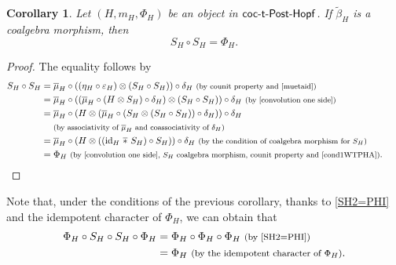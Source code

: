 \documentclass[pdftex]{sigma}
\numberwithin{equation}{section}
\newtheorem{Corollary}[Theorem]{Corollary}
\DeclareMathOperator{\barast}{\,\overline{\ast}\,}
\begin{document}
\begin{Corollary}
Let $(H,m_{H},\Phi_{H})$ be an object in $\sf{coc}\textnormal{-}\sf{t}\textnormal{-}\sf{Post}\textnormal{-}\sf{Hopf}$. If $\tilde{\beta}_{H}$ is a coalgebra morphism, then
\begin{equation}\label{SH2=PHI}
S_{H}\circ S_{H}=\Phi_{H}.
\end{equation}
\end{Corollary}
\begin{proof} The equality follows by
\begin{align*}
S_{H}\circ S_{H}
={}&\overline{\mu}_{H}\circ((\eta_{H}\circ\varepsilon_{H})\otimes(S_{H}\circ S_{H}))\circ\delta_{H}\ \text{\footnotesize\textnormal{(by counit property and \eqref{muetaid})}}\\
={}&\overline{\mu}_{H}\circ((\overline{\mu}_{H}\circ(H\otimes S_{H})\circ\delta_{H})\otimes(S_{H}\circ S_{H}))\circ\delta_{H}\ \text{\footnotesize\textnormal{(by \eqref{convolution one side})}}\\
={}&\overline{\mu}_{H}\circ(H\otimes(\overline{\mu}_{H}\circ(S_{H}\otimes(S_{H}\circ S_{H}))\circ\delta_{H}))\circ\delta_{H}\\
&{}\text{\footnotesize\textnormal{(by associativity of $\overline{\mu}_{H}$ and coassociativity of $\delta_{H}$)}}\\
={}&\overline{\mu}_{H}\circ(H\otimes(({\rm id}_{H}\barast S_{H})\circ S_{H}))\circ\delta_{H}\ \text{\footnotesize\textnormal{(by the condition of coalgebra morphism for $S_{H}$)}}\\
={}&\Phi_{H}\ \text{\footnotesize\textnormal{(by \eqref{convolution one side}, $S_{H}$ coalgebra morphism, counit property and $\eqref{cond1WTPHA}$)}}.\tag*{\qed}
\end{align*}
\renewcommand{\qed}{}
\end{proof}

Note that, under the conditions of the previous corollary, thanks to \eqref{SH2=PHI} and the idempotent character of $\Phi_{H}$, we can obtain that
\begin{align}
\Phi_{H}\circ S_{H}\circ S_{H}\circ \Phi_{H}={}&\Phi_{H}\circ\Phi_{H}\circ\Phi_{H}\ \text{\footnotesize\textnormal{(by \eqref{SH2=PHI})}}\nonumber\\
={}&\Phi_{H}\ \text{\footnotesize\textnormal{(by the idempotent character of $\Phi_{H}$)}}.\label{impliSH2=PHI}
\end{align}
\end{document}
